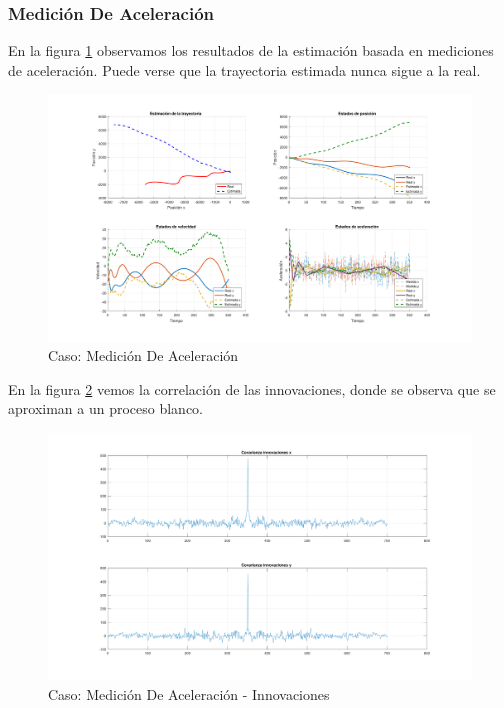 		\subsubsection{Medición De Aceleración}
		
		En la figura \ref{fig:ej2c} observamos los resultados de la estimación basada en mediciones de aceleración. Puede verse que la trayectoria estimada nunca sigue a la real.
		
		\begin{figure}[H]
			\centering
			\includegraphics[scale=0.5,trim={6,5cm 0 0 0}]{Figuras/graf_ej2c.pdf}
			\caption{Caso: Medición De Aceleración}
			\label{fig:ej2c}
		\end{figure}
		
		En la figura \ref{fig:ej2c_innov} vemos la correlación de las innovaciones, donde se observa que se aproximan a un proceso blanco.
		
		\begin{figure}[H]
			\centering
			\includegraphics[width=1.0\textwidth,keepaspectratio]{Figuras/covinn_ej2c.pdf}
			\caption{Caso: Medición De Aceleración - Innovaciones}
			\label{fig:ej2c_innov}
		\end{figure}

